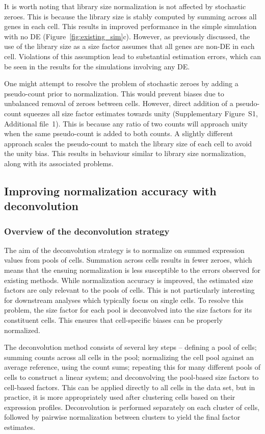 \documentclass{bmcart}
\newcommand{\supppseudo}{S1}
\begin{document}
It is worth noting that library size normalization is not affected by stochastic zeroes.
This is because the library size is stably computed by summing across all genes in each cell.
This results in improved performance in the simple simulation with no DE (Figure~\ref{fig:existing_sim}c).
However, as previously discussed, the use of the library size as a size factor assumes that all genes are non-DE in each cell.
Violations of this assumption lead to substantial estimation errors, which can be seen in the results for the simulations involving any DE.

One might attempt to resolve the problem of stochastic zeroes by adding a pseudo-count prior to normalization.
This would prevent biases due to unbalanced removal of zeroes between cells.
However, direct addition of a pseudo-count squeezes all size factor estimates towards unity (Supplementary Figure~\supppseudo{}, Additional file~1).
This is because any ratio of two counts will approach unity when the same pseudo-count is added to both counts.
A slightly different approach scales the pseudo-count to match the library size of each cell to avoid the unity bias.
This results in behaviour similar to library size normalization, along with its associated problems.

\subsection*{Improving normalization accuracy with deconvolution}

\subsubsection*{Overview of the deconvolution strategy}
The aim of the deconvolution strategy is to normalize on summed expression values from pools of cells.
Summation across cells results in fewer zeroes, which means that the ensuing normalization is less susceptible to the errors observed for existing methods.
While normalization accuracy is improved, the estimated size factors are only relevant to the pools of cells.
This is not particularly interesting for downstream analyses which typically focus on single cells.
To resolve this problem, the size factor for each pool is deconvolved into the size factors for its constituent cells.
This ensures that cell-specific biases can be properly normalized.

The deconvolution method consists of several key steps --
    defining a pool of cells;
    summing counts across all cells in the pool;
    normalizing the cell pool against an average reference, using the count sums;
    repeating this for many different pools of cells to construct a linear system;
    and deconvolving the pool-based size factors to cell-based factors.
This can be applied directly to all cells in the data set, but in practice, it is more appropriately used after clustering cells based on their expression profiles.
Deconvolution is performed separately on each cluster of cells, followed by pairwise normalization between clusters to yield the final factor estimates.
\end{document}
